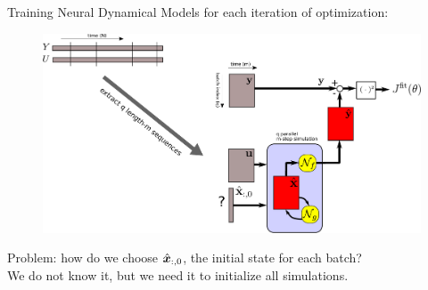 \documentclass{beamer}
\begin{document}

\begin{frame}{Training Neural Dynamical Models}
for each iteration of  optimization:
\begin{figure}
\centering
\includegraphics[width=.8\textwidth]{img/scheme/scheme_multistep_plain.pdf}
\end{figure}
\pause
Problem: how do we choose $\hat {\bm{x}}_{:, 0}$, the initial state for each batch? \\
We do not know it, but we need it to initialize all simulations.
\end{frame}
\end{document}

